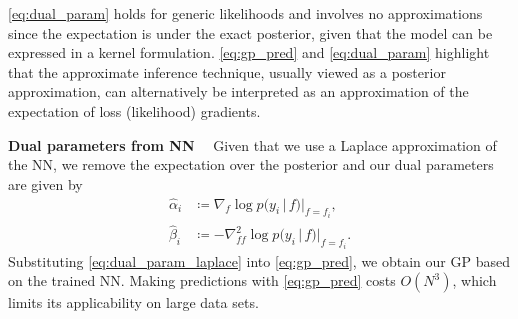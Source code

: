 \documentclass{article}
\renewcommand{\paragraph}[1]{{\bf #1}~~}
\renewcommand{\mid}{\,|\,}
\begin{document}
%
\cref{eq:dual_param} holds for generic likelihoods and involves no approximations since the expectation is under the
exact posterior, given that the model can be expressed in a kernel formulation.
\cref{eq:gp_pred} and \cref{eq:dual_param} highlight that the approximate inference technique, usually viewed as a posterior approximation,
can alternatively be interpreted as an approximation of the expectation of loss (likelihood) gradients.


\paragraph{Dual parameters from NN}
Given that we use a Laplace approximation of the NN, we remove the expectation over the posterior \citep[see Ch.~3.4.1 in][for derivation]{rasmussen2006gaussian} and our dual parameters are given by
%
\begin{subequations}
\label{eq:dual_param_laplace}
\begin{align}
  \hat{\alpha}_i &\coloneqq \nabla_{f}\log p(y_i \mid f) |_{f=f_i} , \\
  \hat{\beta}_i &\coloneqq - \nabla^2_{ff}\log p(y_i \mid f) |_{f=f_i}.
  \end{align}
\end{subequations}
%
Substituting \cref{eq:dual_param_laplace} into \cref{eq:gp_pred}, we obtain our GP based on the trained NN.
Making predictions with \cref{eq:gp_pred} costs $O(N^3)$, which limits its applicability on large data sets.
\end{document}
